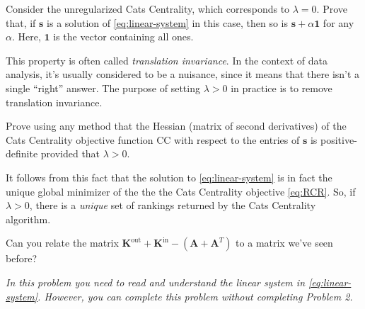 \documentclass{hw}
\begin{document}

Consider the unregularized Cats Centrality, which corresponds to $\lambda = 0$. 
Prove that, if $\mathbf{s}$ is a solution of \eqref{eq:linear-system} in this case, then so is $\mathbf{s} + \alpha \mathbf{1}$ for any $\alpha$. 
Here, $\mathbf{1}$ is the vector containing all ones. 

\begin{note}
    This property is often called \emph{translation invariance}.
    In the context of data analysis, it's usually considered to be a nuisance, since it means that there isn't a single ``right'' answer. 
    The purpose of setting $\lambda > 0$ in practice is to remove translation invariance. 
\end{note}


Prove using any method that the Hessian (matrix of second derivatives) of the Cats Centrality objective function $\mathrm{CC}$ with respect to the entries of $\mathbf{s}$ is positive-definite provided that $\lambda > 0$. 

\begin{note}
    It follows from this fact that the solution to \eqref{eq:linear-system} is in fact the unique global minimizer of the the the Cats Centrality objective \eqref{eq:RCR}. 
    So, if $\lambda > 0$, there is a \emph{unique} set of rankings returned by the Cats Centrality algorithm.   
\end{note}

\begin{hint}
    Can you relate the matrix $\mathbf{K}^\mathrm{out} + \mathbf{K}^{\mathrm{in}} - (\mathbf{A} + \mathbf{A}^T)$ to a matrix we've seen before? 
\end{hint}












\emph{In this problem you need to read and understand the linear system in \eqref{eq:linear-system}. However, you can complete this problem without completing Problem 2.}
\end{document}
